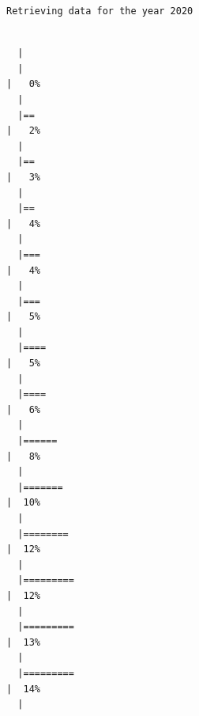 \documentclass[
  letterpaper,
  DIV=11,
  numbers=noendperiod]{scrreprt}
\begin{document}
\begin{verbatim}
Retrieving data for the year 2020
\end{verbatim}

\begin{verbatim}

  |                                                                            
  |                                                                      |   0%
  |                                                                            
  |==                                                                    |   2%
  |                                                                            
  |==                                                                    |   3%
  |                                                                            
  |==                                                                    |   4%
  |                                                                            
  |===                                                                   |   4%
  |                                                                            
  |===                                                                   |   5%
  |                                                                            
  |====                                                                  |   5%
  |                                                                            
  |====                                                                  |   6%
  |                                                                            
  |======                                                                |   8%
  |                                                                            
  |=======                                                               |  10%
  |                                                                            
  |========                                                              |  12%
  |                                                                            
  |=========                                                             |  12%
  |                                                                            
  |=========                                                             |  13%
  |                                                                            
  |=========                                                             |  14%
  |                                                                            

\end{verbatim}
\end{document}
